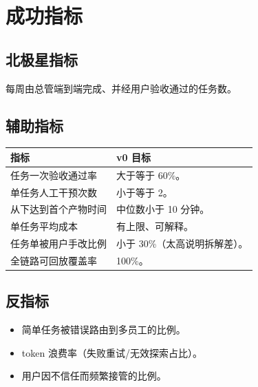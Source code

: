 \documentclass[UTF8,11pt,a4paper,fontset=windows]{ctexart}
\let\ocsection\section
\renewcommand{\section}{\Needspace{8\baselineskip}\ocsection}
\let\ocsubsection\subsection
\renewcommand{\subsection}{\Needspace{5\baselineskip}\ocsubsection}
\begin{document}
\section{成功指标}

\subsection*{北极星指标}

\begin{keybox}[北极星]
每周由总管端到端完成、并经用户验收通过的任务数。
\end{keybox}

\subsection*{辅助指标}

\noindent\begin{minipage}{\linewidth}
\centering
{}
\small
\begin{tabularx}{\linewidth}{@{}p{6.0cm} X@{}}
\toprule
\textbf{指标} & \textbf{v0 目标} \\
\midrule
任务一次验收通过率 & 大于等于 60\%。 \\
单任务人工干预次数 & 小于等于 2。 \\
从下达到首个产物时间 & 中位数小于 10 分钟。 \\
单任务平均成本 & 有上限、可解释。 \\
任务单被用户手改比例 & 小于 30\%（太高说明拆解差）。 \\
全链路可回放覆盖率 & 100\%。 \\
\bottomrule
\end{tabularx}
\end{minipage}

\subsection*{反指标}

\begin{itemize}
  \item 简单任务被错误路由到多员工的比例。
  \item token 浪费率（失败重试/无效探索占比）。
  \item 用户因不信任而频繁接管的比例。
\end{itemize}
\end{document}
